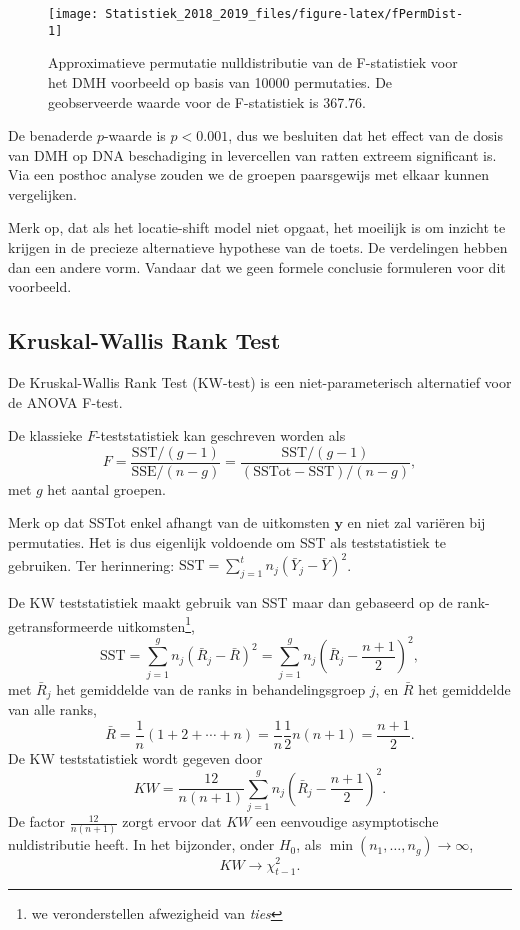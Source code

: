 \documentclass[12pt,dutch,coursenotes]{book}
\let\rmarkdownfootnote\footnote%
\def\footnote{\protect\rmarkdownfootnote}
\theoremstyle{definition}
\theoremstyle{definition}
\theoremstyle{definition}
\theoremstyle{remark}
\begin{document}
\begin{figure}

{\centering \texttt{[image: Statistiek\_2018\_2019\_files/figure-latex/fPermDist-1]} 

}

\caption{Approximatieve permutatie nulldistributie van de F-statistiek voor het DMH voorbeeld op basis van 10000 permutaties. De geobserveerde waarde voor de F-statistiek is 367.76.}\label{fig:fPermDist}
\end{figure}

De benaderde \(p\)-waarde is \(p<0.001\), dus we besluiten dat het
effect van de dosis van DMH op DNA beschadiging in levercellen van
ratten extreem significant is. Via een posthoc analyse zouden we de
groepen paarsgewijs met elkaar kunnen vergelijken.

Merk op, dat als het locatie-shift model niet opgaat, het moeilijk is om
inzicht te krijgen in de precieze alternatieve hypothese van de toets.
De verdelingen hebben dan een andere vorm. Vandaar dat we geen formele
conclusie formuleren voor dit voorbeeld.

\subsection{Kruskal-Wallis Rank Test}\label{kruskal-wallis-rank-test}

De Kruskal-Wallis Rank Test (KW-test) is een niet-parameterisch
alternatief voor de ANOVA F-test.

De klassieke \(F\)-teststatistiek kan geschreven worden als \[
    F = \frac{\text{SST}/(g-1)}{\text{SSE}/(n-g)} = \frac{\text{SST}/(g-1)}{(\text{SSTot}-\text{SST})/(n-g)} ,
  \] met \(g\) het aantal groepen.

Merk op dat SSTot enkel afhangt van de uitkomsten \(\mathbf{y}\) en niet
zal variëren bij permutaties. Het is dus eigenlijk voldoende om SST als
teststatistiek te gebruiken. Ter herinnering:
\(\text{SST}=\sum_{j=1}^t n_j(\bar{Y}_j-\bar{Y})^2\).

De KW teststatistiek maakt gebruik van SST maar dan gebaseerd op de
rank-getransformeerde uitkomsten\footnote{we veronderstellen afwezigheid
  van \emph{ties}}, \[
     \text{SST} = \sum_{j=1}^g n_j \left(\bar{R}_j - \bar{R}\right)^2 = \sum_{j=1}^g n_j \left(\bar{R}_j - \frac{n+1}{2}\right)^2 ,
  \] met \(\bar{R}_j\) het gemiddelde van de ranks in behandelingsgroep
\(j\), en \(\bar{R}\) het gemiddelde van alle ranks, \[
    \bar{R} = \frac{1}{n}(1+2+\cdots + n) = \frac{1}{n}\frac{1}{2}n(n+1) = \frac{n+1}{2}.
  \] De KW teststatistiek wordt gegeven door \[
    KW = \frac{12}{n(n+1)}  \sum_{j=1}^g n_j \left(\bar{R}_j - \frac{n+1}{2}\right)^2.
  \] De factor \(\frac{12}{n(n+1)}\) zorgt ervoor dat \(KW\) een
eenvoudige asymptotische nuldistributie heeft. In het bijzonder, onder
\(H_0\), als \(\min(n_1,\ldots, n_g)\rightarrow \infty\), \[
    KW  \rightarrow \chi^2_{t-1}.
  \]
\end{document}
